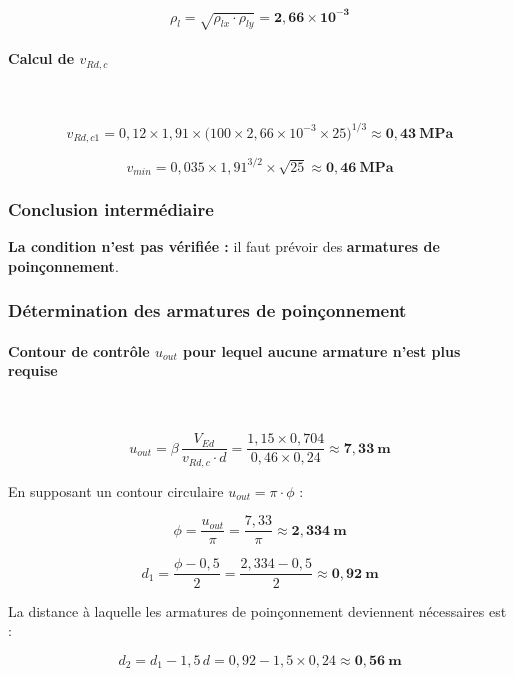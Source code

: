 \[
\rho_l = \sqrt{\rho_{lx} \cdot \rho_{ly}} = \mathbf{2{,}66 \times 10^{-3}}
\]

\paragraph{Calcul de $v_{Rd,c}$}~

\[
v_{Rd,c1} = 0{,}12 \times 1{,}91 \times \big(100 \times 2{,}66 \times 10^{-3} \times 25\big)^{1/3} \approx \mathbf{0{,}43~\text{MPa}}
\]

\[
v_{min} = 0{,}035 \times 1{,}91^{3/2} \times \sqrt{25} \approx \mathbf{0{,}46~\text{MPa}}
\]


\subsubsection{Conclusion intermédiaire}


\textbf{La condition n'est pas vérifiée :} il faut prévoir des \textbf{armatures de poinçonnement}.

\subsubsection{Détermination des armatures de poinçonnement}

\paragraph{Contour de contrôle $u_{out}$ pour lequel aucune armature n'est plus requise}~

\[
u_{out} = \beta \, \frac{V_{Ed}}{v_{Rd,c} \cdot d} = \frac{1{,}15 \times 0{,}704}{0{,}46 \times 0{,}24} \approx \mathbf{7{,}33~\text{m}}
\]

En supposant un contour circulaire $u_{out} = \pi \cdot \phi$ :

\[
\phi = \frac{u_{out}}{\pi} = \frac{7{,}33}{\pi} \approx \mathbf{2{,}334~\text{m}}
\]

\[
d_1 = \frac{\phi - 0{,}5}{2} = \frac{2{,}334 - 0{,}5}{2} \approx \mathbf{0{,}92~\text{m}}
\]

La distance à laquelle les armatures de poinçonnement deviennent nécessaires est :

\[
d_2 = d_1 - 1{,}5 \, d = 0{,}92 - 1{,}5 \times 0{,}24 \approx \mathbf{0{,}56~\text{m}}
\]

